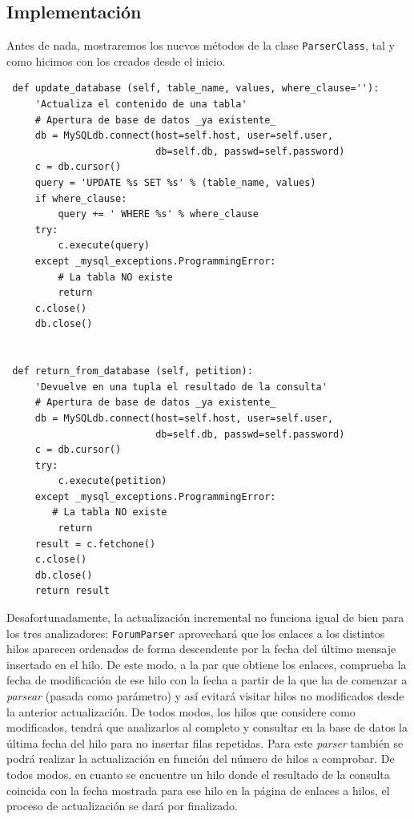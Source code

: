\subsection{Implementación}
Antes de nada, mostraremos los nuevos métodos de la clase \texttt{Parser\-Class}, tal
y como hicimos con los creados desde el inicio.

{\scriptsize
\begin{verbatim}
 def update_database (self, table_name, values, where_clause=''):
     'Actualiza el contenido de una tabla'
     # Apertura de base de datos _ya existente_
     db = MySQLdb.connect(host=self.host, user=self.user,
                          db=self.db, passwd=self.password)
     c = db.cursor()
     query = 'UPDATE %s SET %s' % (table_name, values)
     if where_clause:
         query += ' WHERE %s' % where_clause
     try:
         c.execute(query)
     except _mysql_exceptions.ProgrammingError:
         # La tabla NO existe
         return
     c.close()
     db.close()


 def return_from_database (self, petition):
     'Devuelve en una tupla el resultado de la consulta'
     # Apertura de base de datos _ya existente_
     db = MySQLdb.connect(host=self.host, user=self.user,
                          db=self.db, passwd=self.password)
     c = db.cursor()
     try:
         c.execute(petition)
     except _mysql_exceptions.ProgrammingError:
        # La tabla NO existe
         return
     result = c.fetchone()
     c.close()
     db.close()
     return result
\end{verbatim}
}

Desafortunadamente, la actualización incremental no funciona igual de bien
para los tres analizadores:
\texttt{ForumParser} aprovechará que los enlaces a los distintos hilos aparecen
ordenados de forma descendente por la fecha del último mensaje insertado en el
hilo. De este modo, a la par que obtiene los enlaces, comprueba la fecha de
modificación de ese hilo con la fecha a partir de la que ha de comenzar a
\textit{parsear} (pasada como parámetro) y así evitará visitar hilos no
modificados desde la anterior actualización. De todos modos, los hilos que
considere como modificados, tendrá que analizarlos al completo y consultar en
la base de datos la última fecha del hilo para no insertar filas repetidas.
Para este \textit{parser} también se podrá realizar la actualización en función
del número de hilos a comprobar. De todos modos, en cuanto se encuentre un hilo
donde el resultado de la consulta coincida con la fecha mostrada para ese hilo
en la página de enlaces a hilos, el proceso de actualización se dará por finalizado.

